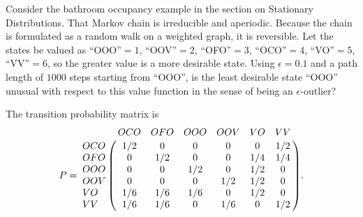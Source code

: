 \documentclass[12pt]{article}
\begin{document}
\begin{exercise}
    Consider the bathroom occupancy example in the section on Stationary
    Distributions.  That Markov chain is irreducible and aperiodic.
    Because the chain is formulated as a random walk on a weighted
    graph, it is reversible.  Let the states be valued as ``OOO''\( =1 \),
    ``OOV''\( =2 \), ``OFO''\( =3 \), ``OCO''\( =4 \), ``VO''\( =5 \),
    ``VV''\( =6 \), so the greater value is a more desirable state.
    Using \( \epsilon=0.1 \) and a path length of \( 1000 \) steps
    starting from ``OOO'', is the least desirable state ``OOO'' unusual
    with respect to this value function in the sense of being an \(
    \epsilon \)-outlier?

    The transition probability matrix is
    \[
        P= \bordermatrix{       & OCO   & OFO   & OOO   & OOV   & VO
        & VV \cr
        OCO     & 1/2   & 0     & 0     & 0     & 0     & 1/2 \cr
        OFO     & 0     & 1/2   & 0     & 0     & 1/4   & 1/4 \cr
        OOO     & 0     & 0     & 1/2   & 0     & 1/2   & 0 \cr
        OOV     & 0     & 0     & 0     & 1/2   & 1/2   & 0 \cr
        VO      & 1/6   & 1/6   & 1/6   & 0     & 1/2   & 0 \cr
        VV      & 1/6   & 1/6   & 0     & 1/6   & 0     & 1/2 \cr
        }.
    \]
\end{exercise}
\end{document}
